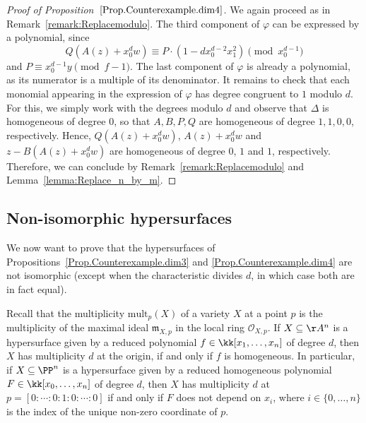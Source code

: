 \begin{proof}[Proof of Proposition~$\ref{Prop.Counterexample.dim4}$]
We again proceed as in Remark~\ref{remark:Replacemodulo}.
The third component of $\varphi$ can be expressed by a polynomial, since
\[
Q(A(z)+x_0^{d}w)\equiv P\cdot (1- d x_0^{d-2}x_1^2)\pmod{x_0^{d-1}}
\]
and $P\equiv x_0^{d-1}y\pmod{f-1}$.
The last component of $\varphi$ is already a polynomial, as its numerator is a multiple of its denominator. It remains to check that each monomial appearing in the expression of $\varphi$ has degree congruent to $1$ modulo $d$. For this, we simply work with the degrees modulo $d$ and observe that $\Delta$ is homogeneous of degree $0$, so that $A,B,P,Q$ are homogeneous of degree $1,1,0,0$, respectively.
Hence, $Q(A(z)+x_0^dw)$, $A(z) + x_0^d w$ and $z-B(A(z)+x_0^{d}w)$ are homogeneous of degree
$0$, $1$ and $1$, respectively.
Therefore, we can conclude by Remark~\ref{remark:Replacemodulo} and
Lemma~\ref{lemma:Replace_n_by_m}.
\end{proof}

\subsection{Non-isomorphic hypersurfaces}
\label{Subsec.Counter_examples}
We now want to prove that the hypersurfaces of Propositions~\ref{Prop.Counterexample.dim3} and \ref{Prop.Counterexample.dim4} are not isomorphic (except when the characteristic divides $d$, in which case both are in fact equal).

Recall that the multiplicity $\mathrm{mult}_p(X)$ of a variety $X$ at a point $p$ is the multiplicity of the maximal ideal $\mathfrak{m}_{X,p}$ in the local ring $\mathcal{O}_{X,p}$.
If $X \subseteq \AA^n$ is a hypersurface given by a reduced polynomial
$f \in \kk[x_1, \ldots, x_n]$ of degree $d$, then $X$ has multiplicity
$d$ at the origin, if and only if $f$ is homogeneous. In particular,
if $X \subseteq \PP^n$ is a hypersurface given by a reduced homogeneous polynomial
$F \in \kk[x_0, \ldots, x_n]$ of degree $d$, then $X$ has multiplicity $d$ at
$p = [0: \cdots : 0: 1 : 0 : \cdots : 0]$
if and only if $F$ does not depend on $x_i$, where $i \in \{0, \ldots, n\}$
is the index of the unique non-zero coordinate of $p$.

